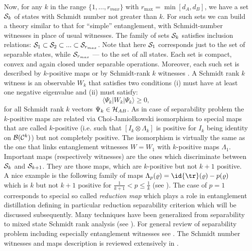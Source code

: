 \documentclass[rmp,12pt,preprint]{revtex4-2}
\begin{document}
Now, for any $k$ in the range $\{1,\ldots,r_{max}\}$ with
$r_{\max}=\min[d_{A},d_{B}]$, we have a set ${\cal S}_{k}$ of states
with Schmidt number not greater than $k$.  For such sets we can build
a theory similar to that for ``simple'' entanglement, with
Schmidt-number witnesses in place of usual witnesses. The family of
sets ${\cal S}_{k}$ satisfies inclusion relations: ${\cal S}_{1}
\subset {\cal S}_{2} \subset ... \subset {\cal S}_{r_{max}}$. Note
that here ${\cal S}_{1}$ corresponds just to the set of separable
states, while ${\cal S}_{r_{max}}$ --- to the set of all states. Each
set is compact, convex and again closed under separable operations.
Moreover, each such set is described by $k$-positive maps
\cite{Terhal-Pawel-rank} or by Schmidt-rank $k$ witnesses
\cite{SchmidtWitn}. A Schmidt rank $k$ witness is an observable
$W_{k}$ that satisfies two conditions (i) must have at least one
negative eigenvalue and (ii) must satisfy:
\begin{equation}
\langle \Psi_{k} |W_{k}|\Psi_{k}\rangle \geq 0,
\end{equation}
for all Schmidt rank $k$ vectors $\Psi_{k}\in {\cal H}_{AB}$. As in
case of separability problem the $k$-positive maps are related via
Choi-Jamio\l{}kowski isomorphism to special maps that are called
$k$-positive (i.e. such that $[I_{k} \otimes \Lambda_{k}]$ is positive
for $I_{k}$ being identity on ${\cal B}({\cal C}^{k})$) but not
completely positive. The isomorphism is virtually the same as the one
that links entanglement witnesses $W=W_{1}$ with $k$-positive maps
$\Lambda_{1}$. Important maps (respectively witnesses) are the ones
which discriminate between ${\cal S}_{k}$ and ${\cal S}_{k+1}$. They
are those maps, which are $k$-positive but not $k+1$ positive. A nice
example is the following family of maps $\Lambda_{p}(\varrho)=\id
{\tr}(\varrho) - p(\varrho)$ which is $k$ but not $k+1$ positive for
$\frac{1}{k+1}<p \leq \frac{1}{k}$ (see \cite{Terhal-Pawel-rank}). The
case of $p=1$ corresponds to special so called {\it reduction map}
which plays a role in entanglement distillation defining in particular
reduction separability criterion which will be discussed subsequently.
Many techniques have been generalized from separability to mixed state
Schmidt rank analysis (see \cite{SchmidtWitn}). For general review of
separability problem including especially entanglement witnesses see
\cite{BrussReview,TerhalReview,BrussReflections}. The Schmidt number
witnesses and maps description is reviewed extensively in
\cite{BrussReflections}.
\end{document}
